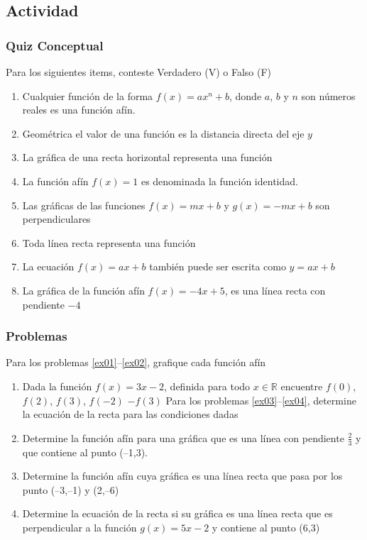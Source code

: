 \documentclass[letterpaper,11pt,twoside]{article}
\begin{document}
\begin{multicols}{2}
 \subsection*{Actividad}
 \subsubsection*{Quiz Conceptual}
 Para los siguientes items, conteste Verdadero (V) o Falso (F)
 \begin{enumerate}
 \item Cualquier función de la forma $f(x)=ax^{n}+b$, donde $a$, $b$ y $n$ son números reales es una función afín.
 \item Geométrica el valor de una función es la distancia directa del eje $y$
 \item La gráfica de una recta horizontal representa una función
 \item La función afín $f(x)=1$ es denominada la función identidad.
 \item Las gráficas de las funciones $f(x)=mx+b$ y $g(x)=-mx+b$ son perpendiculares
 \item Toda línea recta representa una función
 \item La ecuación $f(x)=ax+b$ también puede ser escrita como $y=ax+b$
 \item La gráfica de la función afín $f(x)=-4x+5$, es una línea recta con pendiente $-4$
 \end{enumerate}
 \subsubsection*{Problemas}
 Para los problemas \ref{ex01}--\ref{ex02}, grafique cada función afín
 \begin{enumerate}
 \item Dada la función $f(x)=3x-2$, definida para todo $x\in \mathbb{R}$ encuentre $f(0)$, $f(2)$, $f(3)$, $f(-2)$ $-f(3)$
Para los problemas \ref{ex03}--\ref{ex04}, determine la ecuación de la recta para las condiciones dadas
\item \label{ex03} Determine la función afín para una gráfica que es una línea con pendiente $\frac{2}{3}$ y que contiene al punto (--1,3).
\item Determine la función afín cuya gráfica es una línea recta que pasa por los punto (--3,--1) y (2,--6)
\item \label{ex04} Determine la ecuación de la recta si su gráfica es una línea recta que es perpendicular a la función $g(x)=5x-2$ y contiene al punto (6,3)


\end{enumerate}
\end{multicols}
\end{document}
